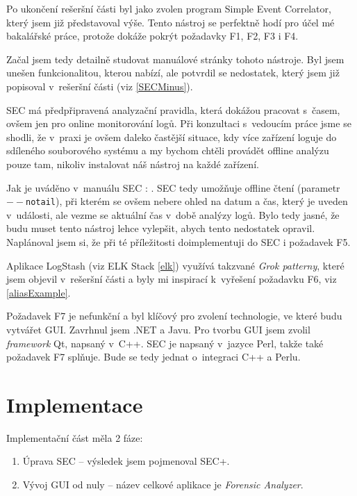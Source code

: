 \documentclass[thesis=B,czech]{FITthesis}[2012/06/26]
\begin{document}
Po ukončení rešeršní části byl jako  zvolen program Simple Event Correlator, který jsem již představoval výše. Tento nástroj se perfektně hodí pro účel mé bakalářské práce, protože dokáže pokrýt požadavky F1, F2, F3 i F4.

Začal jsem tedy detailně studovat manuálové stránky tohoto nástroje. Byl jsem unešen funkcionalitou, kterou nabízí, ale potvrdil se nedostatek, který jsem již popisoval v~rešeršní části (viz \ref{SECMinus}).

SEC má předpřipravená analyzační pravidla, která dokážou pracovat s~časem, ovšem jen pro online monitorování logů. Při konzultaci s~vedoucím práce jsme se shodli, že v~praxi je ovšem daleko častější situace, kdy více zařízení loguje do sdíleného souborového systému a my bychom chtěli provádět offline analýzu pouze tam, nikoliv instalovat náš nástroj na každé zařízení.

Jak je uváděno v~manuálu SEC \cite{secManPage}: \textit{}. SEC tedy umožňuje offline čtení (parametr \texttt{$--$notail}), při kterém se ovšem nebere ohled na datum a čas, který je uveden v~události, ale vezme se aktuální čas v~době analýzy logů. Bylo tedy jasné, že budu muset tento nástroj lehce vylepšit, abych tento nedostatek opravil. Naplánoval jsem si, že při té příležitosti doimplementuji do SEC i požadavek F5.

Aplikace LogStash (viz ELK Stack \ref{elk}) využívá takzvané \textit{Grok patterny}, které jsem objevil v~rešeršní části a byly mi inspirací k~vyřešení požadavku F6, viz \ref{aliasExample}.

Požadavek F7 je nefunkční a byl klíčový pro zvolení technologie, ve které budu vytvářet GUI. Zavrhnul jsem .NET a Javu. Pro tvorbu GUI jsem zvolil \textit{framework} Qt, napsaný v~C++. SEC je napsaný v~jazyce Perl, takže také požadavek F7 splňuje. Bude se tedy jednat o~integraci C++ a Perlu.

\section{Implementace}
Implementační část měla 2 fáze:
\begin{enumerate}
	\item Úprava SEC -- výsledek jsem pojmenoval SEC+.
	\item Vývoj GUI od nuly -- název celkové aplikace je \textit{Forensic Analyzer}.
\end{enumerate}
\end{document}
